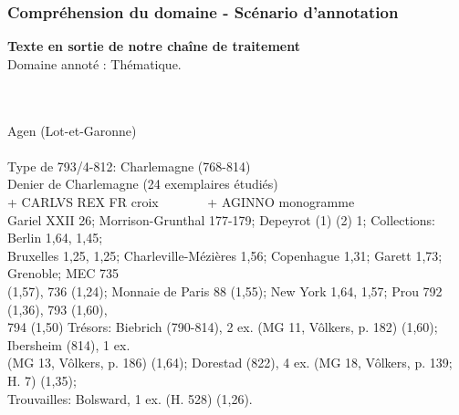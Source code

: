 \documentclass[10pt, compress]{beamer}
\begin{document}
\begin{frame}[fragile]
	\frametitle{Compréhension du domaine - Scénario d'annotation}

	\textbf{Texte en sortie de notre chaîne de traitement}\\
	Domaine annoté : \colorbox{blue!30}{Thématique}.\\~\\~\\
\begin{scriptsize}
\colorbox{blue!30}{Agen (Lot-et-Garonne)}\\~\\

\colorbox{blue!30}{Type de 793/4-812}: Charlemagne (768-814)\\
\colorbox{blue!30}{Denier de Charlemagne} (24 exemplaires étudiés)\\
\colorbox{blue!30}{+ CARLVS REX FR croix~~~~~~~ + AGINNO monogramme}\\
Gariel XXII 26; Morrison-Grunthal 177-179; Depeyrot (1) (2) 1; Collections: \colorbox{blue!30}{Berlin 1,64, 1,45;}\\
\colorbox{blue!30}{Bruxelles 1,25, 1,25; Charleville-Mézières 1,56; Copenhague 1,31; Garett 1,73; Grenoble; MEC 735} \\
\colorbox{blue!30}{(1,57), 736 (1,24); Monnaie de Paris 88 (1,55); New York 1,64, 1,57; Prou 792 (1,36), 793 (1,60),} \\
\colorbox{blue!30}{794 (1,50)} Trésors: \colorbox{blue!30}{Biebrich (790-814), 2 ex. (MG 11, Vôlkers, p. 182) (1,60); Ibersheim (814), 1 ex.} \\
\colorbox{blue!30}{(MG 13, Vôlkers, p. 186) (1,64); Dorestad (822), 4 ex. (MG 18, Vôlkers, p. 139; H. 7) (1,35);}\\
Trouvailles: \colorbox{blue!30}{Bolsward, 1 ex. (H. 528) (1,26).}
\end{scriptsize}
\end{frame}

\end{document}
